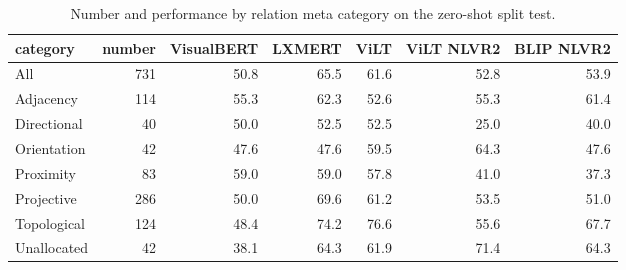 \begin{table}[ht]
\centering
\begin{tabular}{lrrrrrr}
\toprule
category &  number &  VisualBERT &  LXMERT &  ViLT &  ViLT NLVR2 &  BLIP NLVR2 \\
\midrule
All         &     731 &        50.8 &    65.5 &  61.6 &        52.8 &        53.9 \\
\midrule
Adjacency   &     114 &        55.3 &    62.3 &  52.6 &        55.3 &        61.4 \\
Directional &      40 &        50.0 &    52.5 &  52.5 &        25.0 &        40.0 \\
Orientation &      42 &        47.6 &    47.6 &  59.5 &        64.3 &        47.6 \\
Proximity   &      83 &        59.0 &    59.0 &  57.8 &        41.0 &        37.3 \\
Projective  &     286 &        50.0 &    69.6 &  61.2 &        53.5 &        51.0 \\
Topological &     124 &        48.4 &    74.2 &  76.6 &        55.6 &        67.7 \\
Unallocated &      42 &        38.1 &    64.3 &  61.9 &        71.4 &        64.3 \\
\bottomrule
\end{tabular}
\caption{Number and performance by relation meta category on the zero-shot split test.}
\label{tab:results-by-relation-meta-category-zeroshot}
\end{table}
